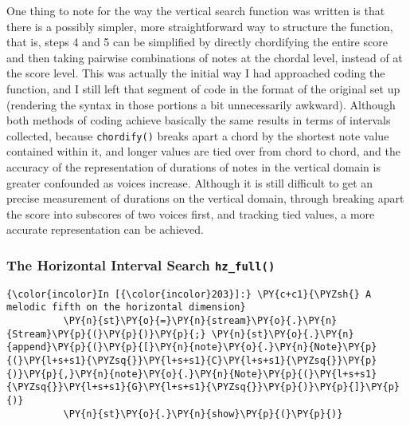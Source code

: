 One thing to note for the way the vertical search function was written
is that there is a possibly simpler, more straightforward way to
structure the function, that is, steps 4 and 5 can be simplified by
directly chordifying the entire score and then taking pairwise
combinations of notes at the chordal level, instead of at the score
level. This was actually the initial way I had approached coding the
function, and I still left that segment of code in the format of the
original set up (rendering the syntax in those portions a bit
unnecessarily awkward). Although both methods of coding achieve
basically the same results in terms of intervals collected, because
\texttt{chordify()} breaks apart a chord by the shortest note value
contained within it, and longer values are tied over from chord to
chord, and the accuracy of the representation of durations of notes in
the vertical domain is greater confounded as voices increase. Although
it is still difficult to get an precise measurement of durations on the
vertical domain, through breaking apart the score into subscores of two
voices first, and tracking tied values, a more accurate representation
can be achieved.

\subsubsection{\texorpdfstring{The Horizontal Interval Search
\texttt{hz\_full()}}{The Horizontal Interval Search hz\_full()}}\label{the-horizontal-interval-search-hz_full}


    \begin{Verbatim}[commandchars=\\\{\}]
{\color{incolor}In [{\color{incolor}203}]:} \PY{c+c1}{\PYZsh{} A melodic fifth on the horizontal dimension}
          \PY{n}{st}\PY{o}{=}\PY{n}{stream}\PY{o}{.}\PY{n}{Stream}\PY{p}{(}\PY{p}{)}\PY{p}{;} \PY{n}{st}\PY{o}{.}\PY{n}{append}\PY{p}{(}\PY{p}{[}\PY{n}{note}\PY{o}{.}\PY{n}{Note}\PY{p}{(}\PY{l+s+s1}{\PYZsq{}}\PY{l+s+s1}{C}\PY{l+s+s1}{\PYZsq{}}\PY{p}{)}\PY{p}{,}\PY{n}{note}\PY{o}{.}\PY{n}{Note}\PY{p}{(}\PY{l+s+s1}{\PYZsq{}}\PY{l+s+s1}{G}\PY{l+s+s1}{\PYZsq{}}\PY{p}{)}\PY{p}{]}\PY{p}{)}
          \PY{n}{st}\PY{o}{.}\PY{n}{show}\PY{p}{(}\PY{p}{)}
\end{Verbatim}

